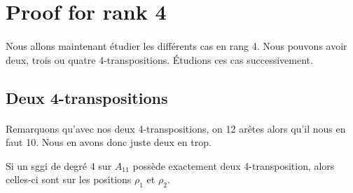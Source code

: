 \section{Proof for rank 4}

\paragraph{}
Nous allons maintenant étudier les différents cas en rang 4. Nous pouvons avoir deux, trois ou quatre 4-transpositions. Étudions ces cas successivement.

\subsection{Deux 4-transpositions}

\paragraph{}
Remarquons qu'avec nos deux 4-transpositions, on 12 arêtes alors qu'il nous en faut 10. Nous en avons donc juste deux en trop.

\begin{theorem}
  Si un sggi de degré $4$ sur $A_{11}$ possède exactement deux 4-transposition, alors celles-ci sont sur les positions $\rho_1$ et $\rho_2$.
\end{theorem}

